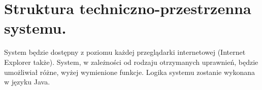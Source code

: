 \documentclass[a4paper,11pt]{article}
\begin{document}


\section {Struktura techniczno-przestrzenna systemu.}
System będzie dostępny z poziomu każdej przeglądarki internetowej (Internet Explorer także). System, w zależności od rodzaju otrzymanych uprawnień, będzie umożliwiał różne, wyżej wymienione funkcje. Logika systemu zostanie wykonana w języku Java. 
\end{document}
